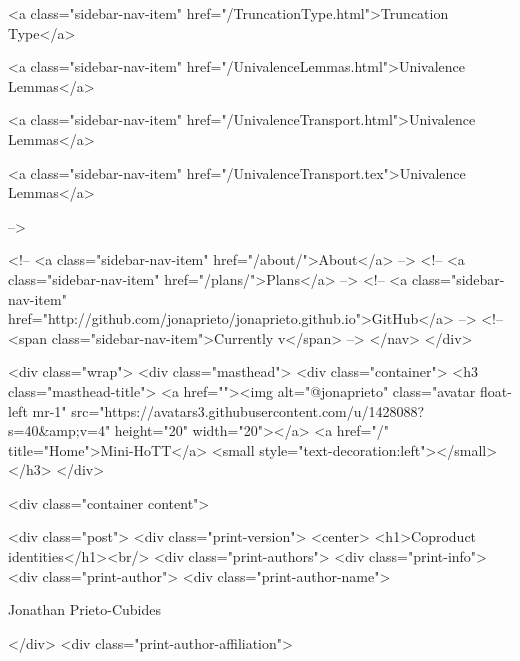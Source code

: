       
    
      
        
          <a class="sidebar-nav-item" href="/TruncationType.html">Truncation Type</a>
        
      
    
      
        
          <a class="sidebar-nav-item" href="/UnivalenceLemmas.html">Univalence Lemmas</a>
        
      
    
      
        
          <a class="sidebar-nav-item" href="/UnivalenceTransport.html">Univalence Lemmas</a>
        
      
    
      
        
          <a class="sidebar-nav-item" href="/UnivalenceTransport.tex">Univalence Lemmas</a>
        
      
     -->

    <!-- <a class="sidebar-nav-item" href="/about/">About</a> -->
    <!-- <a class="sidebar-nav-item" href="/plans/">Plans</a> -->
    <!-- <a class="sidebar-nav-item" href="http://github.com/jonaprieto/jonaprieto.github.io">GitHub</a> -->
    <!-- <span class="sidebar-nav-item">Currently v</span> -->
  </nav>
</div>

    <div class="wrap">
      <div class="masthead">
        <div class="container">
          <h3 class="masthead-title">
            <a href=""><img alt="@jonaprieto" class="avatar float-left mr-1" src="https://avatars3.githubusercontent.com/u/1428088?s=40&amp;v=4" height="20" width="20"></a>
            <a href="/" title="Home">Mini-HoTT</a>
            <small style="text-decoration:left"></small>
          </h3>
        </div>
      
      <div class="container content">
        







<div class="post">
  <div class="print-version">
    <center>
      <h1>Coproduct identities</h1><br/>
        <div class="print-authors">
          <div class="print-info">
            <div class="print-author">
              <div class="print-author-name">
                
                  Jonathan Prieto-Cubides
                
              </div>
              <div class="print-author-affiliation">
                

